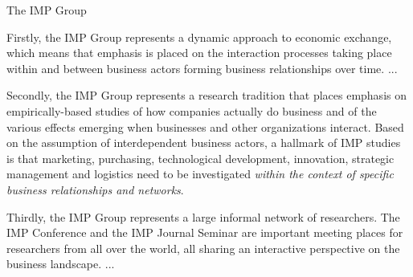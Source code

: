 \documentclass{beamer}
\begin{document}
\begin{frame}{The IMP Group}\small

Firstly, the IMP Group represents a dynamic approach to economic exchange,
which means that emphasis is placed on the interaction processes taking place
within and between business actors forming business relationships over time.
...

Secondly, the IMP Group represents a research tradition that places emphasis
on empirically-based studies of how companies actually do business and of the
various effects emerging when businesses and other organizations interact.
Based on the assumption of interdependent business actors, a hallmark of IMP
studies is that marketing, purchasing, technological development, innovation,
strategic management and logistics need to be investigated \emph{within the
  context of specific business relationships and networks}.

Thirdly, the IMP Group represents a large informal network of researchers. The
IMP Conference and the IMP Journal Seminar are important meeting places for
researchers from all over the world, all sharing an interactive perspective on
the business landscape. ...

\end{frame}

\end{document}
